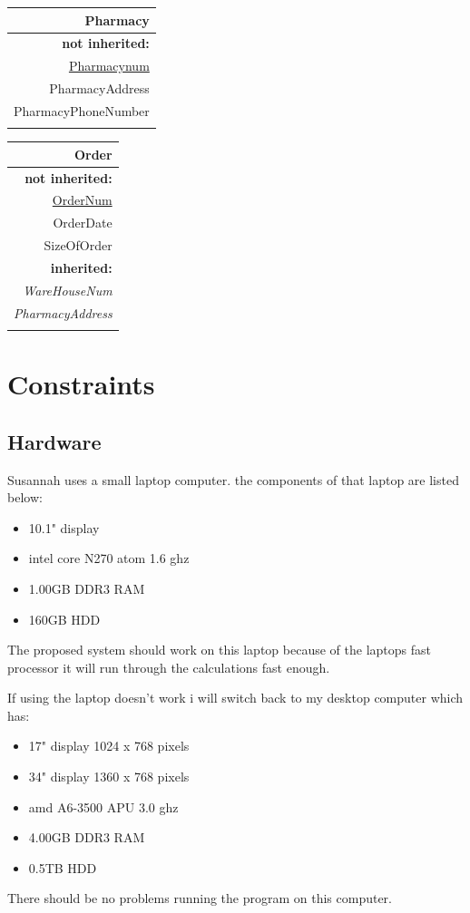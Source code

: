 \begin{table}[h]
\begin{tabular}{|r|}
\hline
\end{tabular}
\begin{tabular}{|r|}
\hline
Pharmacy\\
\hline
\textbf{not inherited:}\\
\underline{Pharmacynum}\\
PharmacyAddress\\
PharmacyPhoneNumber\\
\hline
\\
\hline
\end{tabular}
\begin{tabular}{|r|}
\hline
Order\\
\hline
\textbf{not inherited:}\\
\underline{OrderNum}\\
OrderDate\\
SizeOfOrder\\
\textbf{inherited:}\\
\emph{WareHouseNum}\\
\emph{PharmacyAddress}\\
\hline
\\
\hline
\end{tabular}
\label{tab:nonlin}
\end{table}
\section{Constraints}
\subsection{Hardware}
Susannah uses a small laptop computer. the components of that laptop are listed below:  
\begin{itemize}
\item 10.1" display
\item intel core N270 atom 1.6 ghz
\item 1.00GB DDR3 RAM
\item 160GB HDD 
\end{itemize}
The proposed system should work on this laptop because of the laptops fast processor it will run through the calculations fast enough.

If using the laptop doesn't work i will switch back to my desktop computer which has:
 \begin{itemize}
\item 17" display 1024 x 768 pixels
\item 34" display 1360 x 768 pixels
\item amd A6-3500 APU 3.0 ghz
\item 4.00GB DDR3 RAM
\item 0.5TB HDD 
\end{itemize}
There should be no problems running the program on this computer.
